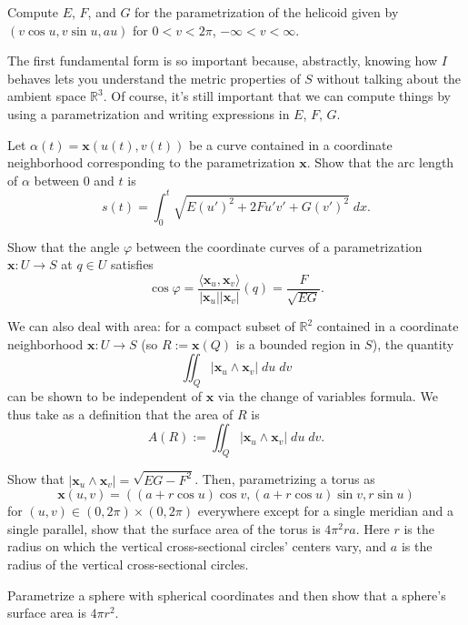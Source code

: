 \documentclass[10pt]{scrartcl}
\providecommand{\RR}{\mathbb R}
\providecommand{\mb}[1]{\mathbf{#1}}
\providecommand{\dif}{\;d}
\begin{document}
\begin{exercise}
	Compute $E$, $F$, and $G$ for the parametrization of the helicoid
	given by $(v\cos u,v\sin u,au)$ for $0<v<2\pi$, $-\infty<v<\infty$.
\end{exercise}

The first fundamental form is so important because, abstractly,
knowing how $I$ behaves lets you understand the metric properties of $S$
without talking about the ambient space $\RR^3$.
Of course, it's still important that we can compute things
by using a parametrization and writing expressions in $E$, $F$, $G$.

\begin{exercise}
	Let $\alpha(t) = \mb x(u(t),v(t))$ be a curve contained in
	a coordinate neighborhood corresponding to the parametrization $\mb x$.
	Show that the arc length of $\alpha$ between $0$ and $t$ is
	\[s(t) = \int_0^t\sqrt{E(u')^2 + 2Fu'v' + G(v')^2}\dif x.\]
\end{exercise}

\begin{exercise}
	Show that the angle $\varphi$ between the coordinate curves of
	a parametrization $\mb x\colon U\to S$ at $q\in U$ satisfies
	\[\cos\varphi = \frac{\langle\mb x_u,\mb x_v\rangle}{|\mb x_u||\mb x_v|}(q)
	= \frac{F}{\sqrt{EG}}.\]
\end{exercise}

We can also deal with area: for a compact subset of $\RR^2$ contained
in a coordinate neighborhood $\mb x\colon U\to S$
(so $R := \mb x(Q)$ is a bounded region in $S$),
the quantity
\[\iint_Q |\mb x_u\wedge\mb x_v|\dif u\dif v\]
can be shown to be independent of $\mb x$ via the change of variables formula.
We thus take as a definition that the area of $R$ is
\[A(R) := \iint_Q |\mb x_u\wedge\mb x_v|\dif u\dif v.\]
\begin{exercise}
	Show that $|\mb x_u\wedge\mb x_v| = \sqrt{EG - F^2}$.
	Then, parametrizing a torus as
	\[\mb x(u,v) = ((a+r\cos u)\cos v,(a+r\cos u)\sin v,r\sin u)\]
	for $(u,v)\in(0,2\pi)\times(0,2\pi)$ everywhere except for
	a single meridian and a single parallel, show that
	the surface area of the torus is $4\pi^2 ra$.
	Here $r$ is the radius on which the vertical cross-sectional
	circles' centers vary, and $a$ is the radius of
	the vertical cross-sectional circles.
\end{exercise}

\begin{exercise}
	Parametrize a sphere with spherical coordinates and then
	show that a sphere's surface area is $4\pi r^2$.
\end{exercise}
\end{document}
